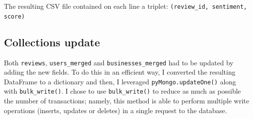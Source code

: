 \documentclass{Configuration_Files/PoliMi3i_thesis}
\begin{document}
\bigskip

The resulting CSV file contained on each line a triplet: \texttt{(review\_id, sentiment, \\score)}

\subsection{Collections update}
Both \texttt{reviews}, \texttt{users\_merged} and \texttt{businesses\_merged} had to be updated by adding the new fields. To do this in an efficient way, I converted the resulting DataFrame to a dictionary and then, I leveraged  \texttt{pyMongo.updateOne()} along with \texttt{bulk\_write()}. I chose to use \texttt{bulk\_write()} to reduce as much as possible the number of transactions; namely, this method is able to perform multiple write operations (inserts, updates or deletes) in a single request to the database. 
\end{document}
